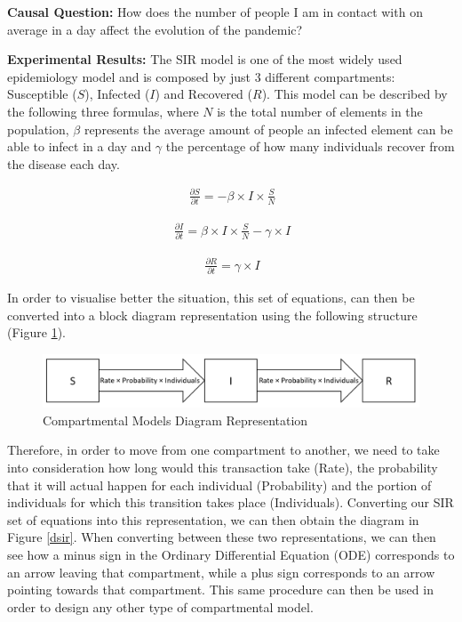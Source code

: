 \textbf{Causal Question:} How does the number of people I am in contact with on average in a day affect the evolution of the pandemic?

\textbf{Experimental Results:} The SIR model is one of the most widely used epidemiology model and is composed by just 3 different compartments: Susceptible ($S$), Infected ($I$) and Recovered ($R$). This model can be described by the following three formulas, where 
$N$ is the total number of elements in the population, $\beta$ represents the average amount of people an infected element can be able to infect in a day and
$\gamma$ the percentage of how many individuals recover from the disease each day.

\useshortskip
\begin{align}
\ \frac{\partial S}{\partial t} = -\beta \times I \times \frac{S}{N}
\end{align}
\useshortskip

\useshortskip
\begin{align}
\ \frac{\partial I}{\partial t} = \beta \times I \times \frac{S}{N} -\gamma \times I
\end{align}
\useshortskip

\useshortskip
\begin{align}
\ \frac{\partial R}{\partial t} = \gamma \times I
\end{align}
\useshortskip

In order to visualise better the situation, this set of equations, can then be converted into a block diagram representation using the following structure (Figure \ref{comp}).

\begin{figure}[ht!]%
    \centering
    \includegraphics[width=0.8\linewidth]{latex/images/comp.pdf}
    \caption{Compartmental Models Diagram Representation}
    \label{comp}
\end{figure}

Therefore, in order to move from one compartment to another, we need to take into consideration how long would this transaction take (Rate), the probability that it will actual happen for each individual (Probability) and the portion of individuals for which this transition takes place (Individuals). Converting our SIR set of equations into this representation, we can then obtain the diagram in Figure \ref{dsir}. When converting between these two representations, we can then see how a minus sign in the Ordinary Differential Equation (ODE) corresponds to an arrow leaving that compartment, while a plus sign corresponds to an arrow pointing towards that compartment. This same procedure can then be used in order to design any other type of compartmental model.

